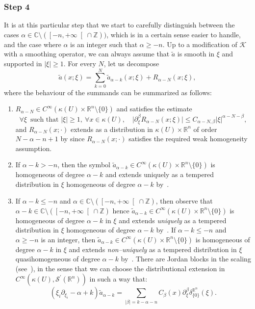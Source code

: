 \documentclass[10pt]{amsart}
\let\pazocal\mathscr
\theoremstyle{definition}
\let\cv\alpha
\let\asigma a
\newcommand{\clopen}[1]{\mathopen{}\mathclose{\left[#1 \right[}}
\newcommand{\step}[1]{\subsubsection*{Step #1}}
\begin{document}
\step{4}
It is at this particular step that we start to carefully distinguish between the cases $\alpha\in\mathbb{C}\setminus(\clopen{-n,+\infty}\cap \mathbb{Z}))$, which is in a certain sense easier to handle, and the case where $\alpha$ is an integer such that $\alpha\geqslant -n$. Up to a modification of $\pazocal{K}$ with a smoothing operator, we can always assume that $\tilde{\asigma}$ is smooth in $\xi$ and supported in $\vert \xi\vert\geqslant 1$.
For every $N$, let us decompose
\[
\tilde{\asigma}(x;\xi)=\sum_{k=0}^N \tilde{\asigma}_{\cv-k}(x;\xi)+R_{\cv-N}(x;\xi),
\]
where the behaviour of the summands can be summarized as follows:
\begin{enumerate}
\item $R_{\cv-N}\in C^\infty\left(\kappa(U)\times \mathbb{R}^n\setminus\{0\} \right)$ and satisfies the estimate
\[
\forall \xi\, \text{ such that } \vert\xi\vert\geqslant 1, \ \forall x\in \kappa(U),\quad \vert \partial_\xi^\beta R_{\cv-N}(x;\xi) \vert\leqslant C_{\cv-N,\beta} \vert\xi\vert^{{\cv-N-\beta} },
\]
and $R_{\cv-N}(x;\cdot) $ extends as a distribution in $\kappa(U)\times \mathbb{R}^n $
of order $ N- \cv-n +1$ by \cite[Th.\,1.8]{DangAHP} since $R_{\cv-N}(x;\cdot) $ satisfies the required weak homogeneity assumption.
\item If $\cv-k>-n$, then the symbol $ \tilde{\asigma}_{\cv-k}\in C^\infty\left(\kappa(U)\times \mathbb{R}^n\setminus\{0\} \right)$ is homogeneous of degree $\cv-k $
and extends uniquely as a tempered distribution in $\xi$ homogeneous of degree $\cv-k$ by~\cite[Th.\,3.2.3]{H}.
\item
If $\cv-k\leqslant -n$ and
$\cv\in\mathbb{C}\setminus(\clopen{-n,+\infty}\cap \mathbb{Z})$,
then observe that $\cv-k\in\mathbb{C}\setminus(\clopen{-n,+\infty}\cap \mathbb{Z}) $ hence
$ \tilde{\asigma}_{\cv-k}\in C^\infty\left(\kappa(U)\times \mathbb{R}^n\setminus\{0\} \right)$ is homogeneous of degree $\cv-k $ in $\xi$
and extends \emph{uniquely} as a tempered distribution in $\xi$ homogeneous of degree $\cv-k$ by~\cite[Th.\,3.2.4]{H}. If $\cv-k\leqslant -n$ and
$\cv\geqslant -n$ is an integer,
then $ \tilde{\asigma}_{\cv-k}\in C^\infty\left(\kappa(U)\times \mathbb{R}^n\setminus\{0\} \right)$ is homogeneous of degree $\cv-k $ in $\xi$
and extends \emph{non--uniquely} as a tempered distribution in $\xi$ quasihomogeneous of degree $\cv-k$ by~\cite[Th.\,3.2.4]{H}.
There are Jordan blocks in the scaling (see~\cite[(3.2.24)$^\prime$]{H}), in the sense that we can choose the distributional extension in $C^\infty(\kappa(U),\pazocal{S}^\prime(\mathbb{R}^n))$ in such a way that:
\[
\left(\xi_i\partial_{\xi_i}-\cv+k\right) \tilde{\asigma}_{\cv-k}= \sum_{\vert \beta\vert=k-\cv-n} C_\beta(x) \partial_\xi^\beta\delta^{\mathbb{R}^n}_{\{0\}}(\xi).
\]
\end{enumerate}
\end{document}
